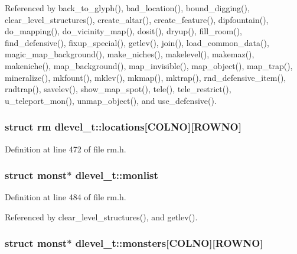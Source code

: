 Referenced by back\+\_\+to\+\_\+glyph(), bad\+\_\+location(), bound\+\_\+digging(), clear\+\_\+level\+\_\+structures(), create\+\_\+altar(), create\+\_\+feature(), dipfountain(), do\+\_\+mapping(), do\+\_\+vicinity\+\_\+map(), dosit(), dryup(), fill\+\_\+room(), find\+\_\+defensive(), fixup\+\_\+special(), getlev(), join(), load\+\_\+common\+\_\+data(), magic\+\_\+map\+\_\+background(), make\+\_\+niches(), makelevel(), makemaz(), makeniche(), map\+\_\+background(), map\+\_\+invisible(), map\+\_\+object(), map\+\_\+trap(), mineralize(), mkfount(), mklev(), mkmap(), mktrap(), rnd\+\_\+defensive\+\_\+item(), rndtrap(), savelev(), show\+\_\+map\+\_\+spot(), tele(), tele\+\_\+restrict(), u\+\_\+teleport\+\_\+mon(), unmap\+\_\+object(), and use\+\_\+defensive().

\hypertarget{structdlevel__t_ae17c672658868c49486afbdc64c4e4b7}{
\subsubsection[{locations}]{\setlength{\rightskip}{0pt plus 5cm}struct {\bf rm} dlevel\+\_\+t\+::locations\mbox{[}{\bf C\+O\+L\+N\+O}\mbox{]}\mbox{[}{\bf R\+O\+W\+N\+O}\mbox{]}}}\label{structdlevel__t_ae17c672658868c49486afbdc64c4e4b7}


Definition at line 472 of file rm.\+h.

\hypertarget{structdlevel__t_a775d40e9ce8233f0079bc9c0af234fa1}{
\subsubsection[{monlist}]{\setlength{\rightskip}{0pt plus 5cm}struct {\bf monst}$\ast$ dlevel\+\_\+t\+::monlist}}\label{structdlevel__t_a775d40e9ce8233f0079bc9c0af234fa1}


Definition at line 484 of file rm.\+h.



Referenced by clear\+\_\+level\+\_\+structures(), and getlev().

\hypertarget{structdlevel__t_abe8e54209520b4c30e1c8a5364ff1457}{
\subsubsection[{monsters}]{\setlength{\rightskip}{0pt plus 5cm}struct {\bf monst}$\ast$ dlevel\+\_\+t\+::monsters\mbox{[}{\bf C\+O\+L\+N\+O}\mbox{]}\mbox{[}{\bf R\+O\+W\+N\+O}\mbox{]}}}\label{structdlevel__t_abe8e54209520b4c30e1c8a5364ff1457}


